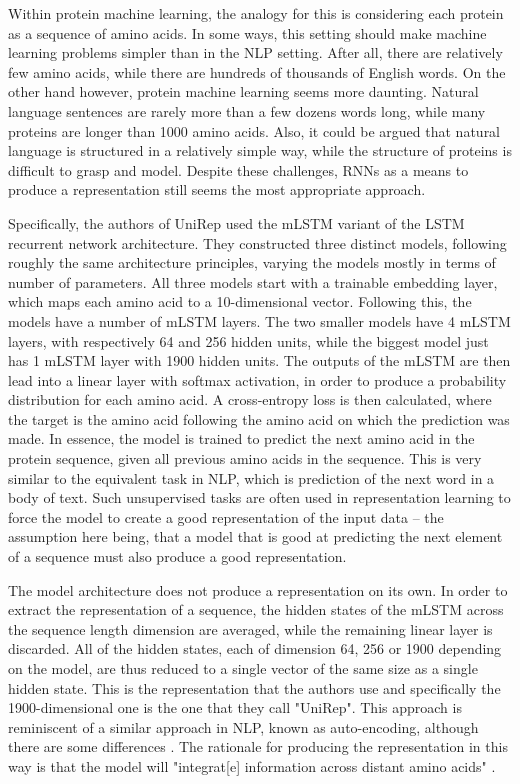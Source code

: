 \documentclass[a4paper,12pt]{article}
\begin{document}
Within protein machine learning, the analogy for this is considering each protein as a sequence of amino acids. In some ways, this setting should make machine learning problems simpler than in the NLP setting. After all, there are relatively few amino acids, while there are hundreds of thousands of English words. On the other hand however, protein machine learning seems more daunting. Natural language sentences are rarely more than a few dozens words long, while many proteins are longer than 1000 amino acids. Also, it could be argued that natural language is structured in a relatively simple way, while the structure of proteins is difficult to grasp and model. Despite these challenges, RNNs as a means to produce a representation still seems the most appropriate approach.

Specifically, the authors of UniRep used the mLSTM variant of the LSTM recurrent network architecture. They constructed three distinct models, following roughly the same architecture principles, varying the models mostly in terms of number of parameters. All three models start with a trainable embedding layer, which maps each amino acid to a 10-dimensional vector. Following this, the models have a number of mLSTM layers. The two smaller models have 4 mLSTM layers, with respectively 64 and 256 hidden units, while the biggest model just has 1 mLSTM layer with 1900 hidden units. The outputs of the mLSTM are then lead into a linear layer with softmax activation, in order to produce a probability distribution for each amino acid. A cross-entropy loss is then calculated, where the target is the amino acid following the amino acid on which the prediction was made. In essence, the model is trained to predict the next amino acid in the protein sequence, given all previous amino acids in the sequence. This is very similar to the equivalent task in NLP, which is prediction of the next word in a body of text. Such unsupervised tasks are often used in representation learning to force the model to create a good representation of the input data -- the assumption here being, that a model that is good at predicting the next element of a sequence must also produce a good representation.

The model architecture does not produce a representation on its own. In order to extract the representation of a sequence, the hidden states of the mLSTM across the sequence length dimension are averaged, while the remaining linear layer is discarded. All of the hidden states, each of dimension 64, 256 or 1900 depending on the model, are thus reduced to a single vector of the same size as a single hidden state. This is the representation that the authors use and specifically the 1900-dimensional one is the one that they call "UniRep". This approach is reminiscent of a similar approach in NLP, known as auto-encoding, although there are some differences . The rationale for producing the representation in this way is that the model will "integrat[e] information across distant amino acids" \cite[p. 9]{alley2019unified}.
\end{document}
